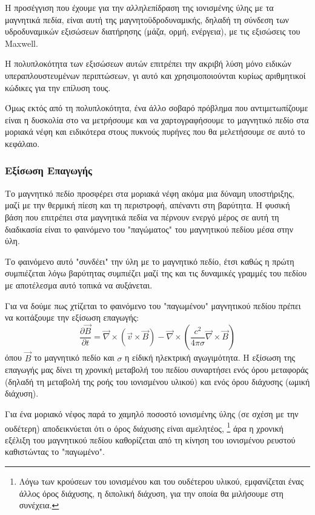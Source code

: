 \documentclass[a4paper,12pt]{memoir}
\newcommand{\pt}[1]{\frac{\partial #1}{\partial t}}
\newcommand{\vv}{\vec{v}}
\newcommand{\bb}{\vec{B}}
\newcommand{\nn}{\vec{\nabla}}
\begin{document}
Η προσέγγιση που έχουμε για την αλληλεπίδραση της ιονισμένης ύλης με τα μαγνητικά πεδία, είναι αυτή της μαγνητοϋδροδυναμικής, δηλαδή τη σύνδεση των υδροδυναμικών εξισώσεων διατήρησης (μάζα, ορμή, ενέργεια), με τις εξισώσεις του Maxwell.  

Η πολυπλοκότητα των εξισώσεων αυτών επιτρέπει την ακριβή λύση μόνο ειδικών υπεραπλουστευμένων περιπτώσεων, γι αυτό και χρησιμοποιούνται κυρίως αριθμητικοί κώδικες για την επίλυση τους.

Όμως εκτός από τη πολυπλοκότητα, ένα άλλο σοβαρό πρόβλημα που αντιμετωπίζουμε είναι η δυσκολία στο να μετρήσουμε και να χαρτογραφήσουμε το μαγνητικό πεδίο στα μοριακά νέφη και ειδικότερα στους πυκνούς πυρήνες που θα μελετήσουμε σε αυτό το κεφάλαιο.  

\subsubsection{Εξίσωση Επαγωγής}
Το μαγνητικό πεδίο προσφέρει στα μοριακά νέφη ακόμα μια δύναμη υποστήριξης, μαζί με την θερμική πίεση και τη περιστροφή, απέναντι στη βαρύτητα. Η φυσική βάση που επιτρέπει στα μαγνητικά πεδία να πέρνουν ενεργό μέρος σε αυτή τη διαδικασία είναι το φαινόμενο του "παγώματος" του μαγνητικού πεδίου μέσα στην ύλη.

Το φαινόμενο αυτό "συνδέει" την ύλη με το μαγνητικό πεδίο, έτσι καθώς η πρώτη συμπιέζεται λόγω βαρύτητας συμπιέζει μαζί της και τις δυναμικές γραμμές του πεδίου με αποτέλεσμα αυτό τοπικά να αυξάνεται.

Για να δούμε πως χτίζεται το φαινόμενο του "παγωμένου" μαγνητικού πεδίου πρέπει να κοιτάξουμε την εξίσωση επαγωγής:
\begin{equation}
\pt{\bb} = \nn \times (\vv \times \bb) -\nn \times \left( \frac{c^2}{4 \pi \sigma} \nn \times \bb \right) 
\end{equation}
όπου  $\bb$ το μαγνητικό πεδίο και $\sigma$ η είδική ηλεκτρική αγωγιμότητα.
Η εξίσωση της επαγωγής μας δίνει τη χρονική μεταβολή του πεδίου συναρτήσει ενός όρου μεταφοράς (δηλαδή τη μεταβολή της ροής του ιονισμένου υλικού) και ενός όρου διάχυσης (ωμική διάχυση).

Για ένα μοριακό νέφος παρά το χαμηλό ποσοστό ιονισμένης ύλης (σε σχέση με την ουδέτερη) αποδεικνύεται ότι ο όρος διάχυσης είναι αμελητέος, \footnote{Λόγω των κρούσεων του ιονισμένου και του ουδέτερου υλικού, εμφανίζεται ένας άλλος όρος διάχυσης, η διπολική διάχυση, για την οποία θα μιλήσουμε στη συνέχεια.} άρα η χρονική εξέλιξη του μαγνητικού πεδίου καθορίζεται από τη κίνηση του ιονισμένου ρευστού καθιστώντας το "παγωμένο".
\end{document}
